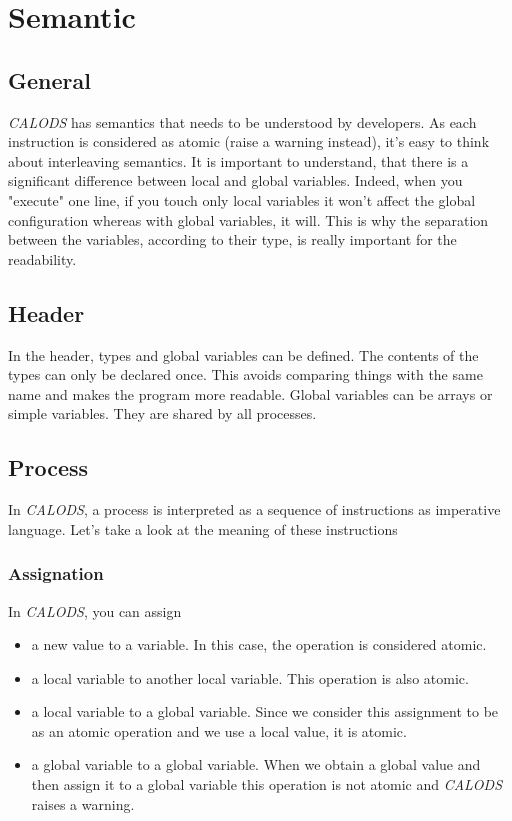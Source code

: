 \documentclass{article}
\begin{document}
\section{Semantic}
\subsection{General}
\textit{CALODS} has semantics that needs to be understood by developers. As each instruction is considered as atomic (raise a warning instead), it's easy to think about interleaving semantics. It is important to understand, that there is a significant difference between local and global variables. Indeed, when you "execute" one line, if you touch only local variables it won't affect the global configuration whereas with global variables, it will. This is why the separation between the variables, according to their type, is really important for the readability.
\subsection{Header}
In the header, types and global variables can be defined. The contents of the types can only be declared once. This avoids comparing things with the same name and makes the program more readable. Global variables can be arrays or simple variables. They are shared by all processes.

\subsection{Process}
In \textit{CALODS}, a process is interpreted as a sequence of instructions as imperative language. Let's take a look at the meaning of these instructions
\subsubsection{Assignation}
In \textit{CALODS}, you can assign
\begin{itemize}
  \item a new value to a variable. In this case, the operation is considered atomic.
  \item a local variable to another local variable. This operation is also atomic.
  \item a local variable to a global variable. Since we consider this assignment to be as an atomic operation and we use a local value, it is atomic.
  \item a global variable to a global variable. When we obtain a global value and then assign it to a global variable this operation is not atomic and \textit{CALODS} raises a warning.
\end{itemize}
\end{document}
